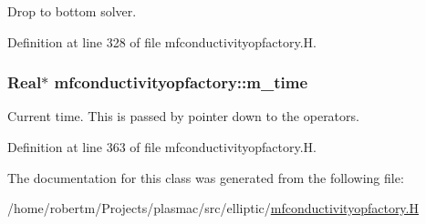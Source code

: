 Drop to bottom solver. 



Definition at line 328 of file mfconductivityopfactory.\+H.

\subsubsection[{\texorpdfstring{m\+\_\+time}{m_time}}]{\setlength{\rightskip}{0pt plus 5cm}Real$\ast$ mfconductivityopfactory\+::m\+\_\+time\hspace{0.3cm}{\ttfamily [protected]}}\hypertarget{classmfconductivityopfactory_a975314e1a2dd2c8c48b56f9cebf68ac8}{}\label{classmfconductivityopfactory_a975314e1a2dd2c8c48b56f9cebf68ac8}


Current time. This is passed by pointer down to the operators. 



Definition at line 363 of file mfconductivityopfactory.\+H.



The documentation for this class was generated from the following file\+:\begin{DoxyCompactItemize}
\item 
/home/robertm/\+Projects/plasmac/src/elliptic/\hyperlink{mfconductivityopfactory_8H}{mfconductivityopfactory.\+H}\end{DoxyCompactItemize}
